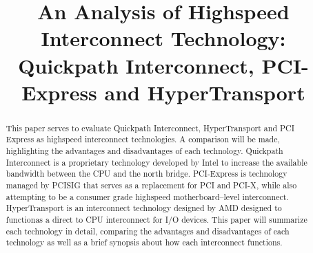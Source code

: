 \documentclass[conference]{IEEEtran}
\begin{document}
%
\title{An Analysis of Highspeed Interconnect Technology: Quickpath
Interconnect, PCI-Express and HyperTransport}


\author{
}

\maketitle


\begin{abstract}
\label{sec:abstract}
This paper serves to evaluate Quickpath Interconnect, HyperTransport and PCI
Express as highspeed interconnect technologies. A comparison will be made,
highlighting the advantages and disadvantages of each technology. Quickpath
Interconnect is a proprietary technology developed by Intel to increase the
available bandwidth between the CPU and the north bridge. PCI-Express is
technology managed by PCISIG that serves as a replacement for PCI and PCI-X,
while also attempting to be a consumer grade highspeed motherboard--level
interconnect. HyperTransport is an interconnect technology designed by AMD
designed to functionas a direct to CPU interconnect for I/O devices. This paper
will summarize each technology in detail, comparing the advantages and
disadvantages of each technology as well as a brief synopsis about how each
interconnect functions. 
\end{abstract}





%
\IEEEpeerreviewmaketitle
\end{document}
